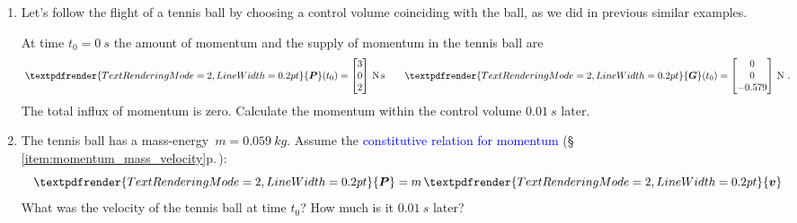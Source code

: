 \documentclass[a4paper,12pt,%
onecolumn,oneside,%
british%
]{memoir}
\renewcommand*{\bm}[1]{\textpdfrender{TextRenderingMode=2,LineWidth=0.2pt}{\boldsymbol{#1}}}
\renewcommand*{\|}[1][]{\nonscript\:#1\vert\nonscript\:\mathopen{}}
\newcommand*{\sect}{\S}%
\renewcommand*{\autoref}[3][\sect\,\ref]{\textcolor{blue}{#3} {\color{blue}\scriptsize(\faIcon[regular]{eye}\;#1{#2}\;p.\,\pageref{#2})}}
\newcommand*{\masse}{mass-energy}
\newcommand*{\yv}{\bm{v}}
\newcommand*{\yti}{t_{0}}
\newcommand*{\ym}{m}%
\newcommand*{\yP}{\bm{P}}
\newcommand*{\yG}{\bm{G}}
\begin{document}
\begin{exercise}[label={ex:tennisball}]
  \begin{enumerate}[exerc]
  \item Let's follow the flight of a tennis ball by choosing a control volume coinciding with the ball, as we did in previous similar examples.

    \smallskip

    At time $\yti=\qty{0}{s}$ the amount of momentum and the supply of momentum in the tennis ball are
    \begin{equation*}
      \yP(\yti) =
      \begin{bmatrix}
        3\\0\\2
      \end{bmatrix}\,\unit{N\,s}
      \qquad
      \yG(\yti) =
      \begin{bmatrix}
        0\\0\\-0.579
      \end{bmatrix}\,\unit{N} \ .
    \end{equation*}
    The total influx of momentum is zero. Calculate the momentum within the control volume $\qty{0.01}{s}$ later.

  \item The tennis ball has a \masse\ $\ym = \qty{0.059}{kg}$. Assume the \autoref{item:momentum_mass_velocity}{constitutive relation for momentum}:
    \begin{equation*}
      \yP = \ym\,\yv
    \end{equation*}
    What was the velocity of the tennis ball at time $\yti$? How much is it $\qty{0.01}{s}$ later?
  \end{enumerate}
\end{exercise}
%
%
\end{document}
